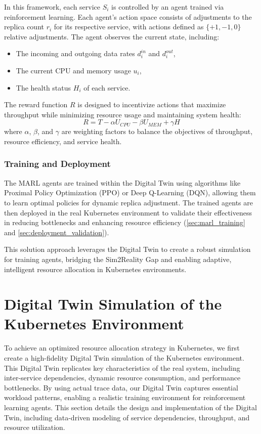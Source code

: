 \documentclass[conference]{IEEEtran}
\begin{document}
In this framework, each service $S_i$ is controlled by an agent trained via reinforcement learning. Each agent's action space consists of adjustments to the replica count $r_i$ for its respective service, with actions defined as $\{+1, -1, 0\}$ relative adjustments. The agent observes the current state, including:
\begin{itemize}
    \item The incoming and outgoing data rates $\mathit{d_i^{in}}$ and $\mathit{d_i^{out}}$,
    \item The current CPU and memory usage $\mathit{u_i}$,
    \item The health status $\mathit{H_i}$ of each service.
\end{itemize}

The reward function $R$ is designed to incentivize actions that maximize throughput while minimizing resource usage and maintaining system health:
\begin{equation}
    R = T - \alpha U_{CPU} - \beta U_{MEM} + \gamma H
\end{equation}
where $\alpha$, $\beta$, and $\gamma$ are weighting factors to balance the objectives of throughput, resource efficiency, and service health.

\subsubsection{Training and Deployment}

The MARL agents are trained within the Digital Twin using algorithms like Proximal Policy Optimization (PPO) or Deep Q-Learning (DQN), allowing them to learn optimal policies for dynamic replica adjustment. The trained agents are then deployed in the real Kubernetes environment to validate their effectiveness in reducing bottlenecks and enhancing resource efficiency (\autoref{sec:marl_training} and \autoref{sec:deployment_validation}).

This solution approach leverages the Digital Twin to create a robust simulation for training agents, bridging the Sim2Reality Gap and enabling adaptive, intelligent resource allocation in Kubernetes environments.


\section{Digital Twin Simulation of the Kubernetes Environment}
\label{sec:digital_twin_design}
To achieve an optimized resource allocation strategy in Kubernetes, we first create a high-fidelity Digital Twin simulation of the Kubernetes environment. This Digital Twin replicates key characteristics of the real system, including inter-service dependencies, dynamic resource consumption, and performance bottlenecks. By using actual trace data, our Digital Twin captures essential workload patterns, enabling a realistic training environment for reinforcement learning agents. This section details the design and implementation of the Digital Twin, including data-driven modeling of service dependencies, throughput, and resource utilization.
\end{document}

